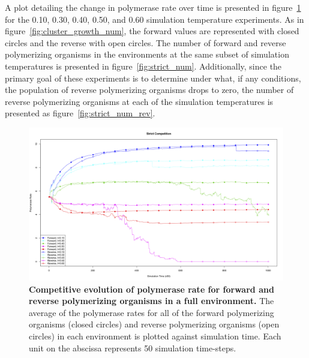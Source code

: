 A plot detailing the change in polymerase rate over time is presented in figure~\ref{fig:strict_rate} for the 0.10, 0.30, 0.40, 0.50, and 0.60 simulation temperature experiments. As in figure~\ref{fig:cluster_growth_num}, the forward values are represented with closed circles and the reverse with open circles. The number of forward and reverse polymerizing organisms in the environments at the same subset of simulation temperatures is presented in figure~\ref{fig:strict_num}. Additionally, since the primary goal of these experiments is to determine under what, if any conditions, the population of reverse polymerizing organisms drops to zero, the number of reverse polymerizing organisms at each of the simulation temperatures is presented as figure~\ref{fig:strict_num_rev}.

\begin{figure}[h]
	\centering
		\includegraphics[width=\textwidth]{strict_rate}
	\caption{\textbf{Competitive evolution of polymerase rate for forward and reverse polymerizing organisms in a full environment.} The average of the polymerase rates for all of the forward polymerizing organisms (closed circles) and reverse polymerizing organisms (open circles) in each environment is plotted against simulation time. Each unit on the abscissa represents 50 simulation time-steps.}
	\label{fig:strict_rate}
\end{figure}

